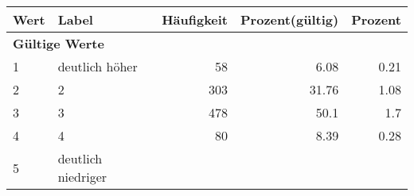      \begin{longtable}{lXrrr}
     \toprule
     \textbf{Wert} & \textbf{Label} & \textbf{Häufigkeit} & \textbf{Prozent(gültig)} & \textbf{Prozent} \\
     \endhead
     \midrule
     \multicolumn{5}{l}{\textbf{Gültige Werte}}\\

     1 &
     \multicolumn{1}{X}{ deutlich höher   } &


       \num{58} &
       \num[round-mode=places,round-precision=2]{6.08} &
         \num[round-mode=places,round-precision=2]{0.21} \\

     2 &
     \multicolumn{1}{X}{ 2   } &


       \num{303} &
       \num[round-mode=places,round-precision=2]{31.76} &
         \num[round-mode=places,round-precision=2]{1.08} \\

     3 &
     \multicolumn{1}{X}{ 3   } &


       \num{478} &
       \num[round-mode=places,round-precision=2]{50.1} &
         \num[round-mode=places,round-precision=2]{1.7} \\

     4 &
     \multicolumn{1}{X}{ 4   } &


       \num{80} &
       \num[round-mode=places,round-precision=2]{8.39} &
         \num[round-mode=places,round-precision=2]{0.28} \\

     5 &
     \multicolumn{1}{X}{ deutlich niedriger   } &



\end{longtable}
